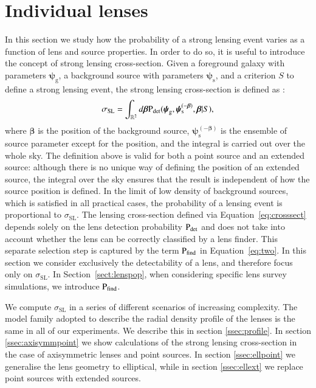 \documentclass{aa}
\def\psilens{\boldsymbol{\psi}_\mathrm{g}}
\def\psisource{\boldsymbol{\psi}_\mathrm{s}}
\def\psisourcenobeta{\boldsymbol{\psi}_\mathrm{s}^{(-\boldsymbol\beta)}}
\def\pdet{{\rm P}_\mathrm{det}}
\def\pfind{{\rm P}_\mathrm{find}}
\def\crosssect{\sigma_\mathrm{{SL}}}
\def\Sref#1{Section~\ref{#1}\xspace}
\def\Eref#1{Equation~\ref{#1}\xspace}
\begin{document}

\section{Individual lenses}\label{sect:indlenses}

In this section we study how the probability of a strong lensing event varies as a function of lens and source properties.
In order to do so, it is useful to introduce the concept of strong lensing cross-section.
Given a foreground galaxy with parameters $\psilens$, a background source with parameters $\psisource$, and a criterion $S$ to define a strong lensing event, the strong lensing cross-section is defined as \citep{Son22}:
\begin{equation}\label{eq:crosssect}
\crosssect = \int_{\mathbb{R}^2} d\boldsymbol\beta \pdet(\psilens,\psisourcenobeta,\boldsymbol\beta|S),
\end{equation}
where $\boldsymbol\beta$ is the position of the background source, $\psisourcenobeta$ is the ensemble of source parameter except for the position, and the integral is carried out over the whole sky.
The definition above is valid for both a point source and an extended source: although there is no unique way of defining the position of an extended source, the integral over the sky ensures that the result is independent of how the source position is defined.
In the limit of low density of background sources, which is satisfied in all practical cases, the probability of a lensing event is proportional to $\crosssect$.
The lensing cross-section defined via \Eref{eq:crosssect} depends solely on the lens detection probability $\pdet$ and does not take into account whether the lens can be correctly classified by a lens finder.
This separate selection step is captured by the term $\pfind$ in \Eref{eq:two}.
In this section we consider exclusively the detectability of a lens, and therefore focus only on $\crosssect$. In \Sref{sect:lenspop}, when considering specific lens survey simulations, we introduce $\pfind$.

We compute $\crosssect$ in a series of different scenarios of increasing complexity.
The model family adopted to describe the radial density profile of the lenses is the same in all of our experiments. We describe this in section \ref{ssec:profile}.
In section \ref{ssec:axisymmpoint} we show calculations of the strong lensing cross-section in the case of axisymmetric lenses and point sources.
In section \ref{ssec:ellpoint} we generalise the lens geometry to elliptical, while in section \ref{ssec:ellext} we replace point sources with extended sources.
\end{document}
